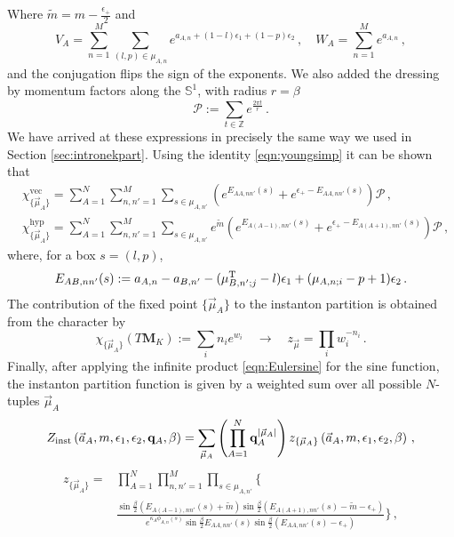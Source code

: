 \documentclass[main.tex]{subfiles}
\begin{document}
Where $\tilde{m}=m-\frac{\epsilon_+}{2}$ and
\begin{equation}
V_A=\sum_{n=1}^M\sum_{(l,p)\in\mu_{A,n}}e^{a_{A,n}+(1-l)\epsilon_1+(1-p)\epsilon_2}\,,\quad W_A=\sum_{n=1}^Me^{a_{A,n}}\,,
\end{equation}
and the conjugation flips the sign of the exponents. We also added the dressing by momentum factors along the $\mathbb{S}^1$, with radius $r=\beta$
\begin{equation}
\mathcal{P}:=\sum_{t\in\mathbb{Z}}e^{\frac{2\pi t}{r}}\,.
\end{equation}
We have arrived at these expressions in precisely the same way we used in Section \ref{sec:intronekpart}.
Using the identity \eqref{eqn:youngsimp} it can be shown that
\begin{align}
&\chi_{\{\vec{\mu}_A\}}^{\text{vec}}=\sum_{A=1}^N\sum_{n,n'=1}^M\sum_{s\in\mu_{A,n'}}\left(e^{E_{AA,nn'}(s)}+e^{\epsilon_+-E_{AA,nn'}(s)}\right)\mathcal{P}\,,\\
&\chi_{\{\vec{\mu}_A\}}^{\text{hyp}}=\sum_{A=1}^N\sum_{n,n'=1}^M\sum_{s\in\mu_{A,n'}}e^{\tilde{m}}\left(e^{E_{A(A-1),nn'}(s)}+e^{\epsilon_+-E_{A(A+1),nn'}(s)}\right)\mathcal{P}\,,
\end{align}
where, for a box $s=(l,p)$,
\begin{equation}
E_{AB,nn'}(s):=a_{A,n}-a_{B,n'}-(\mu^{\operatorname{T}}_{B,n';j}-l)\epsilon_1+(\mu_{A,n;i}-p+1)\epsilon_2\,.
\end{equation}
The contribution of the fixed point $\{\vec{\mu}_A\}$ to the instanton partition is obtained from the character by
\begin{equation}\label{eqn:conversionrule}
\chi_{\{\vec{\mu}_A\}}\left(T\mathbf{M}_K\right):=\sum_{i}n_ie^{w_i}\quad \to \quad z_{\vec{\mu}}=\prod_{i}w_i^{-n_i}\,.
\end{equation}
Finally, after applying the infinite product \eqref{eqn:Eulersine} for the sine function, the instanton partition function is given by a weighted sum over all possible $N$-tuples $\vec{\mu}_A$
\begin{equation}
Z_{\text{inst}}\left(\vec{a}_A,m,\epsilon_1,\epsilon_2,\mathbf{q}_A,\beta\right)=\sum_{\vec{\mu}_A} \left(\prod_{A=1}^N\mathbf{q}_A^{|\vec{\mu}_A|}\right)z_{\{\vec{\mu}_A\}}\left(\vec{a}_A,m,\epsilon_1,\epsilon_2,\beta\right)\,,
\end{equation}
\begin{equation}
\begin{aligned}
z_{\{\vec{\mu}_A\}}=&\prod_{A=1}^N\prod_{n,n'=1}^M\prod_{s\in\mu_{A,n'}}\Bigg\{\\
&\frac{\sin\frac{\beta}{2}\left(E_{A(A-1),nn'}(s)+\tilde{m}\right)\sin\frac{\beta}{2}\left(E_{A(A+1),nn'}(s)-\tilde{m}-\epsilon_+\right)}{e^{\kappa_A\phi_{A,n}(s)}\sin\frac{\beta}{2}E_{AA,nn'}(s)\sin\frac{\beta}{2}\left(E_{AA,nn'}(s)-\epsilon_+\right)}\Bigg\}\,,
\end{aligned}\label{eqn:fpcont}
\end{equation}
\end{document}
